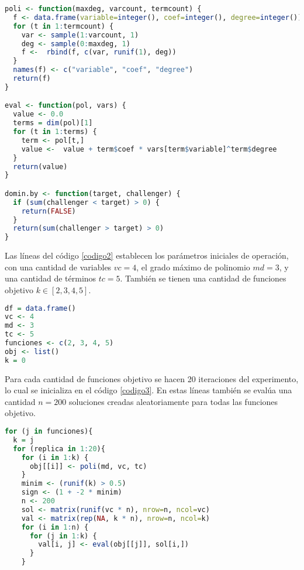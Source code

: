 \documentclass{report}
\begin{document}
\begin{lstlisting}[caption={Creaci\'on y Evaluaci\'on de Polinomios; Verificaci\'on de Soluciones Dominadas}, label=codigo1, language=R]
poli <- function(maxdeg, varcount, termcount) {
  f <- data.frame(variable=integer(), coef=integer(), degree=integer())
  for (t in 1:termcount) {
    var <- sample(1:varcount, 1)
    deg <- sample(0:maxdeg, 1)
    f <-  rbind(f, c(var, runif(1), deg))
  }
  names(f) <- c("variable", "coef", "degree")
  return(f)
}

eval <- function(pol, vars) {
  value <- 0.0
  terms = dim(pol)[1]
  for (t in 1:terms) {
    term <- pol[t,]
    value <-  value + term$coef * vars[term$variable]^term$degree
  }
  return(value)
}

domin.by <- function(target, challenger) {
  if (sum(challenger < target) > 0) {
    return(FALSE)
  }
  return(sum(challenger > target) > 0)
}
\end{lstlisting}

Las l\'ineas del c\'odigo \ref{codigo2} establecen los par\'ametros iniciales de operaci\'on, con una cantidad de variables $vc=4$, el grado m\'aximo de polinomio $md=3$, y una cantidad de t\'erminos $tc=5$. Tambi\'en se tienen una cantidad de funciones objetivo $k \in [2, 3, 4, 5]$.

\begin{lstlisting}[caption={Par\'ametros Iniciales}, label=codigo2, language=R]
df = data.frame()
vc <- 4
md <- 3
tc <- 5
funciones <- c(2, 3, 4, 5)
obj <- list()
k = 0
\end{lstlisting}

Para cada cantidad de funciones objetivo se hacen 20 iteraciones del experimento, lo cual se inicializa en el c\'odigo \ref{codigo3}. En estas l\'ineas tambi\'en se eval\'ua una cantidad $n=200$ soluciones creadas aleatoriamente para todas las funciones objetivo.

\begin{lstlisting}[caption=Inicializaci\'on de Iteraciones y Evaluaci\'on de Soluciones, label=codigo3, language=R]
for (j in funciones){
  k = j
  for (replica in 1:20){
    for (i in 1:k) {
      obj[[i]] <- poli(md, vc, tc)
    }
    minim <- (runif(k) > 0.5)
    sign <- (1 + -2 * minim)
    n <- 200
    sol <- matrix(runif(vc * n), nrow=n, ncol=vc)
    val <- matrix(rep(NA, k * n), nrow=n, ncol=k)
    for (i in 1:n) {
      for (j in 1:k) {
        val[i, j] <- eval(obj[[j]], sol[i,])
      }
    }
\end{lstlisting}
\end{document}
